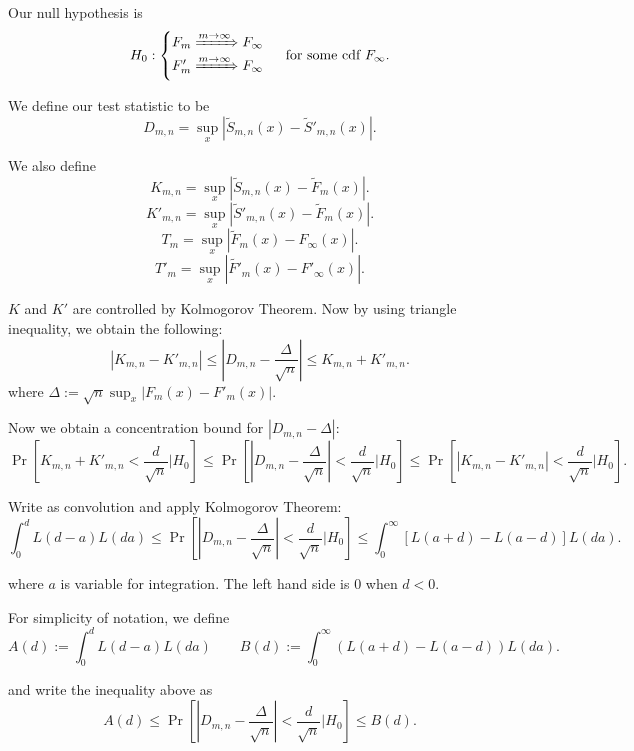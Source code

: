 Our null hypothesis is
\[
	H_0: \begin{cases}
	F_m \xRightarrow{m\to \infty } F_\infty \\
	F'_m \xRightarrow{m\to \infty } F_\infty \\
	\end{cases}
	\text{ for some cdf }F_\infty 
.\] 

We define our test statistic to be
\[
	D_{m, n} = \operatorname{sup}_x \left| \tilde{S}_{m, n}(x) - \tilde{S}'_{m, n}(x)  \right| 
.\] 

We also define
\[
	K_{m, n} = \operatorname{sup}_x \left| \tilde{S}_{m, n}(x) - \tilde{F}_{m}(x)  \right| 
.\]
\[
	K'_{m, n} = \operatorname{sup}_x \left| \tilde{S}'_{m, n}(x) - \tilde{F}_{m}(x)  \right| 
.\]
\[
	T_{m} = \operatorname{sup}_x \left| \tilde{F}_{m}(x) - {F}_\infty (x)  \right| 
.\]
\[
	T'_{m} = \operatorname{sup}_x \left| \tilde{F'}_{m}(x) - {F'}_\infty (x)  \right| 
.\]

$K$ and  $K'$ are controlled by Kolmogorov Theorem. Now by using triangle inequality, we obtain the following:
\[
	|K_{m,n} - K'_{m,n}| \le |D_{m, n} - \frac{\Delta}{\sqrt{n} } | \le K_{m, n} + K'_{m,n}
.\] 
where $\Delta:= \sqrt{n} \operatorname{sup}_x |F_m(x) - F'_m(x)|$.

Now we obtain a concentration bound for $|D_{m, n} - \Delta |$:
 \[
	 \operatorname{Pr} \left[ K_{m, n} + K'_{m,n} < \frac{d}{\sqrt{n} }| H_0 \right] \le 
	 \operatorname{Pr} \left[ |D_{m, n} - \frac{\Delta}{\sqrt{n} }| < \frac{d}{\sqrt{n} }| H_0 \right] \le 
	 \operatorname{Pr} \left[ |K_{m,n} - K'_{m,n}| < \frac{d}{\sqrt{n} }| H_0 \right] 
.\] 

Write as convolution and apply Kolmogorov Theorem:
\begin{equation}
	\label{eqn:2samp-bounds}
	 \int _0^d L(d-a) L(da) \le 
	 \operatorname{Pr} \left[ |D_{m, n} - \frac{\Delta}{\sqrt{n} }| < \frac{d}{\sqrt{n} }| H_0 \right] \le 
	 \int _0^\infty  \left[ L(a+d) - L(a-d) \right] L(da)
.\end{equation}


where $a$ is variable for integration. The left hand side is $0$ when $d < 0$.

For simplicity of notation, we define
\[
	A(d) := \int _0^d L(d-a) L(da)  \qquad
	B(d) := \int _0^\infty  \left( L(a+d) - L(a-d) \right) L(da)
.\] 

and write the inequality above as
\begin{equation}
	 A(d) \le 
	 \operatorname{Pr} \left[ |D_{m, n} - \frac{\Delta}{\sqrt{n} }| < \frac{d}{\sqrt{n} }| H_0 \right] \le 
	B(d) 
.\end{equation}

